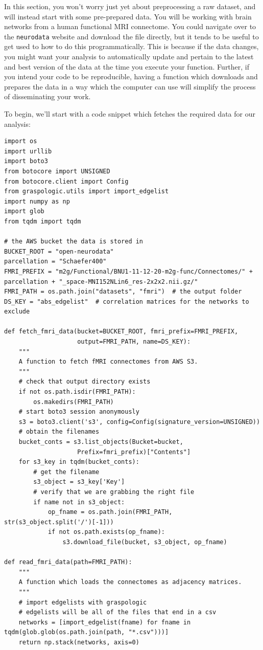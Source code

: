 In this section, you won't worry just yet about preprocessing a raw dataset, and will instead start with some pre-prepared data. You will be working with brain networks from a human functional MRI connectome. You could navigate over to the \texttt{neurodata} website and download the file directly, but it tends to be useful to get used to how to do this programmatically. This is because if the data changes, you might want your analysis to automatically update and pertain to the latest and best version of the data at the time you execute your function. Further, if you intend your code to be reproducible, having a function which downloads and prepares the data in a way which the computer can use will simplify the process of disseminating your work. 

To begin, we'll start with a code snippet which fetches the required data for our analysis:

\begin{lstlisting}[style=python]
import os
import urllib
import boto3
from botocore import UNSIGNED
from botocore.client import Config
from graspologic.utils import import_edgelist
import numpy as np
import glob
from tqdm import tqdm

# the AWS bucket the data is stored in
BUCKET_ROOT = "open-neurodata"
parcellation = "Schaefer400"
FMRI_PREFIX = "m2g/Functional/BNU1-11-12-20-m2g-func/Connectomes/" + parcellation + "_space-MNI152NLin6_res-2x2x2.nii.gz/"
FMRI_PATH = os.path.join("datasets", "fmri")  # the output folder
DS_KEY = "abs_edgelist"  # correlation matrices for the networks to exclude

def fetch_fmri_data(bucket=BUCKET_ROOT, fmri_prefix=FMRI_PREFIX,
                    output=FMRI_PATH, name=DS_KEY):
    """
    A function to fetch fMRI connectomes from AWS S3.
    """
    # check that output directory exists
    if not os.path.isdir(FMRI_PATH):
        os.makedirs(FMRI_PATH)
    # start boto3 session anonymously
    s3 = boto3.client('s3', config=Config(signature_version=UNSIGNED))
    # obtain the filenames
    bucket_conts = s3.list_objects(Bucket=bucket, 
                    Prefix=fmri_prefix)["Contents"]
    for s3_key in tqdm(bucket_conts):
        # get the filename
        s3_object = s3_key['Key']
        # verify that we are grabbing the right file
        if name not in s3_object:
            op_fname = os.path.join(FMRI_PATH, str(s3_object.split('/')[-1]))
            if not os.path.exists(op_fname):
                s3.download_file(bucket, s3_object, op_fname)

def read_fmri_data(path=FMRI_PATH):
    """
    A function which loads the connectomes as adjacency matrices.
    """
    # import edgelists with graspologic
    # edgelists will be all of the files that end in a csv
    networks = [import_edgelist(fname) for fname in tqdm(glob.glob(os.path.join(path, "*.csv")))]
    return np.stack(networks, axis=0)
\end{lstlisting}


